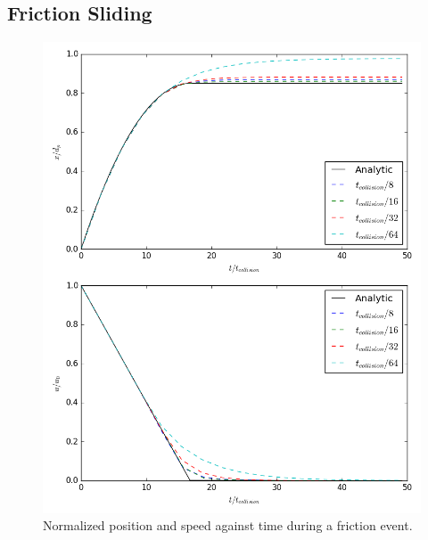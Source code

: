 \documentclass[10pt,a4paper,titlepage]{report}
\begin{document}
\subsection{Friction Sliding}
\begin{figure}[!htb]
\centering
\includegraphics[scale=0.5]{figures/opencl_verification/friction_verification.png}
\caption{Normalized position and speed against time during a friction event.}
\label{fig:opencl_friction_verification}
\end{figure}
\end{document}
